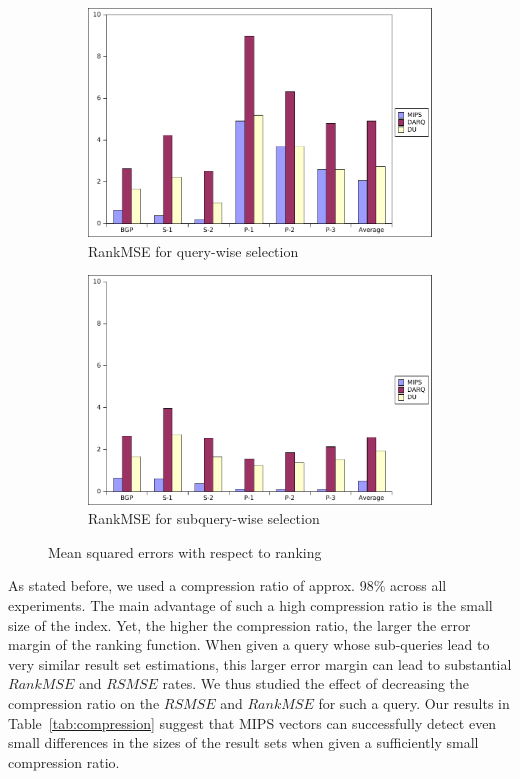 \documentclass{sig-alternate}  %
\begin{document}
\begin{figure}
\centering				
\begin{subfigure}[b]{0.45\textwidth}
                \centering
\includegraphics[width=\textwidth]{img/querywise_ranking}
                \caption{RankMSE for query-wise selection}
                \label{fig:rankQuery}
        \end{subfigure}				
				\begin{subfigure}[b]{0.45\textwidth}
                \centering
\includegraphics[width=\textwidth]{img/subquerywise_ranking}
                \caption{RankMSE for subquery-wise selection}
                \label{fig:rankSubquery}
        \end{subfigure}
\caption{Mean squared errors with respect to ranking}
\label{fig:rank}
\end{figure}

As stated before, we used a compression ratio of approx. 98\% across all experiments. 
The main advantage of such a high compression ratio is the small size of the index. 
Yet, the higher the compression ratio, the larger the error margin of the ranking function.
When given a query whose sub-queries lead to very similar result set estimations,  this larger error margin can lead to substantial $RankMSE$ and $RSMSE$ rates.
We thus studied the effect of decreasing the compression ratio on the $RSMSE$ and $RankMSE$ for such a query.
Our results in Table~\ref{tab:compression} suggest that MIPS vectors can successfully detect even small differences in the sizes of the result sets when given a sufficiently small compression ratio.
\end{document}
